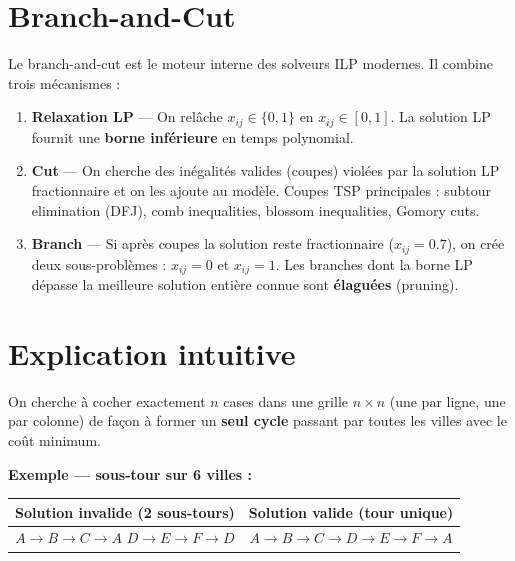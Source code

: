 \documentclass[12pt, a4paper]{article}
\begin{document}
\section{Branch-and-Cut}

Le branch-and-cut est le moteur interne des solveurs ILP modernes. Il combine
trois mécanismes :

\begin{enumerate}
  \item \textbf{Relaxation LP} --- On relâche $x_{ij} \in \{0,1\}$ en $x_{ij} \in [0,1]$.
        La solution LP fournit une \textbf{borne inférieure} en temps polynomial.

  \item \textbf{Cut} --- On cherche des inégalités valides (coupes) violées
        par la solution LP fractionnaire et on les ajoute au modèle.
        Coupes TSP principales : subtour elimination (DFJ), comb inequalities,
        blossom inequalities, Gomory cuts.

  \item \textbf{Branch} --- Si après coupes la solution reste fractionnaire
        ($x_{ij} = 0.7$), on crée deux sous-problèmes : $x_{ij} = 0$ et $x_{ij} = 1$.
        Les branches dont la borne LP dépasse la meilleure solution entière connue
        sont \textbf{élaguées} (pruning).
\end{enumerate}

\section{Explication intuitive}

On cherche à cocher exactement $n$ cases dans une grille $n \times n$
(une par ligne, une par colonne) de façon à former un \textbf{seul cycle} passant
par toutes les villes avec le coût minimum.

\medskip
\textbf{Exemple --- sous-tour sur 6 villes :}

\begin{center}
\begin{tabular}{cc}
  \toprule
  Solution invalide (2 sous-tours) & Solution valide (tour unique) \\
  \midrule
  $A \to B \to C \to A$ \quad $D \to E \to F \to D$ &
  $A \to B \to C \to D \to E \to F \to A$ \\
  \bottomrule
\end{tabular}
\end{center}
\end{document}
